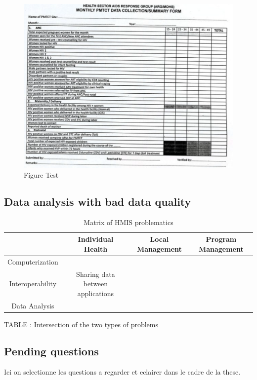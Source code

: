 \documentclass[a4paper,11pt,final,twoside]{article}
\begin{document}
\begin{figure}[ht]
\begin{center}
\includegraphics[scale=0.5]{figure/Picture1.png} 
\caption{Figure Test}
\end{center}
\end{figure}


		\subsection{Data analysis with bad data quality}  

\begin{table}[ht]
\begin{tabular}{cccc}
\hline 
 					& Individual Health & Local Management & Program Management \\ 
\hline 
Computerization & & \\
\hline
Interoperability 	& Sharing data between applications  &  &  \\ 
\hline 
Data Analysis &  &  &  \\ 
\hline 
\end{tabular} 
\caption{Matrix of HMIS problematics}
\end{table}

TABLE : Intersection of the two types of problems
	
	\subsection{Pending questions}

Ici on selectionne les questions a regarder et eclairer dans le cadre de la these.
\end{document}

